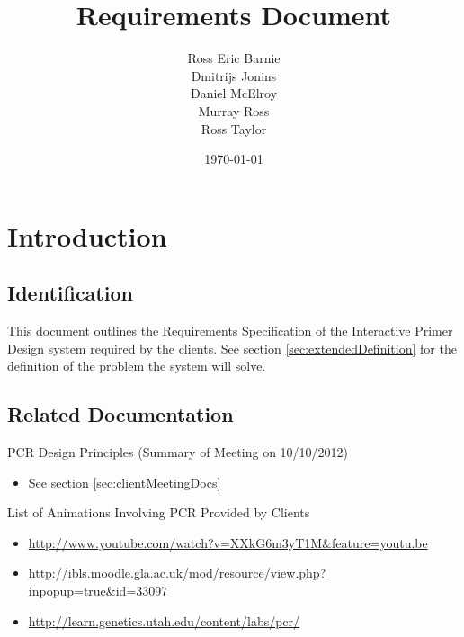 \documentclass{l3deliverable}
\title{Requirements Document}
\author{Ross Eric Barnie \\
        Dmitrijs Jonins \\
        Daniel McElroy \\
        Murray Ross \\
        Ross Taylor
      }
\date{\today}
\begin{document}

\maketitle

\tableofcontents

\newpage


\section{Introduction}

\subsection{Identification}

This document outlines the Requirements Specification of the
Interactive Primer Design system required by the clients. See section
\ref{sec:extendedDefinition} for the definition of the problem the
system will solve.

\subsection{Related Documentation}



PCR Design Principles (Summary of Meeting on 10/10/2012)
\begin{itemize}
\item{See section \ref{sec:clientMeetingDocs}} 
\end{itemize}

List of Animations Involving PCR Provided by Clients
\begin{itemize}
\item{\url{http://www.youtube.com/watch?v=XXkG6m3yT1M&feature=youtu.be}}
\item{\url{http://ibls.moodle.gla.ac.uk/mod/resource/view.php?inpopup=true&id=33097}}
\item{\url{http://learn.genetics.utah.edu/content/labs/pcr/}}
\end{itemize}
\end{document}
